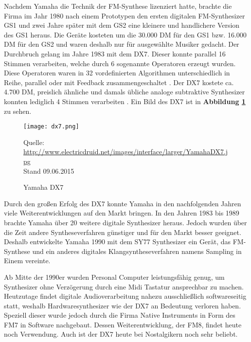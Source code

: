 Nachdem Yamaha die Technik der FM-Synthese lizenziert hatte, brachte die Firma im Jahr 1980 nach einem Prototypen den ersten digitalen FM-Synthesizer GS1 und zwei Jahre später mit dem GS2 eine kleinere und handlichere Version des GS1 heraus. Die Geräte kosteten um die 30.000 DM für den GS1 bzw. 16.000 DM für den GS2 und waren deshalb nur für ausgewählte Musiker gedacht. Der Durchbruch gelang im Jahre 1983 mit dem DX7. Dieser konnte parallel 16 Stimmen verarbeiten, welche durch 6 sogenannte Operatoren erzeugt wurden. Diese Operatoren waren in 32 vordefinierten Algorithmen unterschiedlich in Reihe, parallel oder mit Feedback zusammengeschaltet \cite[S. 11]{dx7manual}. Der DX7 kostete ca. 4.700 DM, preislich ähnliche und damals übliche analoge subtraktive Synthesizer konnten lediglich 4 Stimmen verarbeiten \cite{fmGS1}. Ein Bild des DX7 ist in \textbf{Abbildung \ref{fig:dx7}} zu sehen.

 \begin{figure} [ht]
\centering
  \texttt{[image: dx7.png]}
\caption{Yamaha DX7}
\label{fig:dx7}
Quelle: \url{http://www.electricdruid.net/images/interface/larger/YamahaDX7.jpg}
\\Stand 09.06.2015
\end{figure}

Durch den großen Erfolg des DX7 konnte Yamaha in den nachfolgenden Jahren viele Weiterentwicklungen auf den Markt bringen. In den Jahren 1983 bis 1989 brachte Yamaha über 20 weitere digitale Synthesizer heraus. Jedoch wurden über die Zeit andere Syntheseverfahren günstiger und für den Markt besser geeignet. Deshalb entwickelte Yamaha 1990 mit dem SY77 Synthesizer ein Gerät, das FM-Synthese und ein anderes digitales Klangsyntheseverfahren namens Sampling in Einem vereinte.\cite{fmGS1}

Ab Mitte der 1990er wurden Personal Computer leistungsfähig genug, um Synthesizer ohne Verzögerung durch eine Midi Tastatur ansprechbar zu machen. Heutzutage findet digitale Audioverarbeitung nahezu ausschließlich softwareseitig statt, weshalb Hardwaresynthesizer wie der DX7 an Bedeutung verloren haben. Speziell dieser wurde jedoch durch die Firma Native Instruments in Form des FM7 in Software nachgebaut. Dessen Weiterentwicklung, der FM8, findet heute noch Verwendung. Auch ist der DX7 heute bei Nostalgikern noch sehr beliebt.\cite{fmGS1}